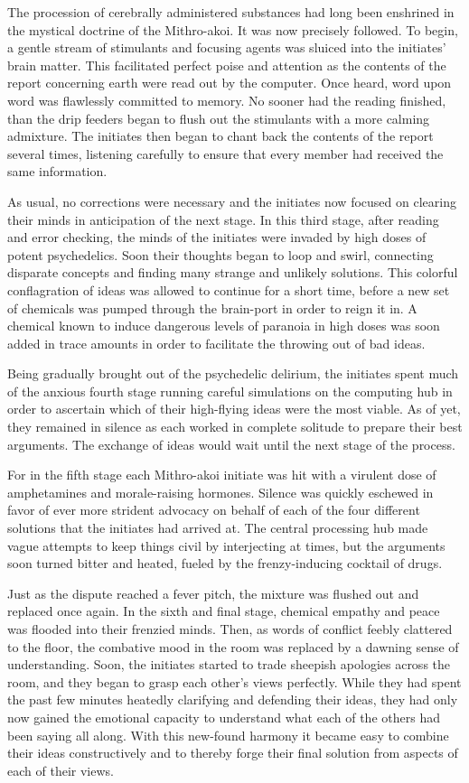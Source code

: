 \documentclass[14pt]{extarticle}
\begin{document}
The procession of cerebrally administered substances had long been enshrined in the mystical doctrine of the Mithro-akoi.
It was now precisely followed.
To begin, a gentle stream of stimulants and focusing agents was sluiced into the initiates' brain matter.
This facilitated perfect poise and attention as the contents of the report concerning earth were read out by the computer.
Once heard, word upon word was flawlessly committed to memory.
No sooner had the reading finished,
than the drip feeders began to flush out the stimulants with a more calming admixture.
The initiates then began to chant back the contents of the report several times, listening carefully to ensure that every member had received the same information.

As usual, no corrections were necessary and the initiates now focused on clearing their minds in anticipation of the next stage.
In this third stage, after reading and error checking, 
the minds of the initiates were invaded by high doses of potent psychedelics.
Soon their thoughts began to loop and swirl, connecting disparate concepts and finding many strange and unlikely solutions.
This colorful conflagration of ideas was allowed to continue for a short time,
before a new set of chemicals was pumped through the brain-port in order to reign it in.
A chemical known to induce dangerous levels of paranoia in high doses was soon added in trace amounts in order to facilitate the throwing out of bad ideas.

Being gradually brought out of the psychedelic delirium,
the initiates spent much of the anxious fourth stage running careful simulations on the computing hub in order to ascertain which of their high-flying ideas were the most viable.
As of yet, they remained in silence as each worked in complete solitude to prepare their best arguments.
The exchange of ideas would wait until the next stage of the process.

For in the fifth stage each Mithro-akoi initiate was hit with a virulent dose of amphetamines and morale-raising hormones.
Silence was quickly eschewed in favor of ever more strident advocacy on behalf of each of the four different solutions that the initiates had arrived at.
The central processing hub made vague attempts to keep things civil by interjecting at times,
but the arguments soon turned bitter and heated,
fueled by the frenzy-inducing cocktail of drugs.

Just as the dispute reached a fever pitch,
the mixture was flushed out and replaced once again.
In the sixth and final stage, 
chemical empathy and peace was flooded into their frenzied minds.
Then, as words of conflict feebly clattered to the floor, the combative mood in the room was replaced by a dawning sense of understanding.
Soon, the initiates started to trade sheepish apologies across the room, 
and they began to grasp each other's views perfectly.
While they had spent the past few minutes heatedly clarifying and defending their ideas, they had only now gained the emotional capacity to understand what each of the others had been saying all along. 
With this new-found harmony it became easy to combine their ideas constructively and to thereby forge their final solution from aspects of each of their views.
\end{document}
